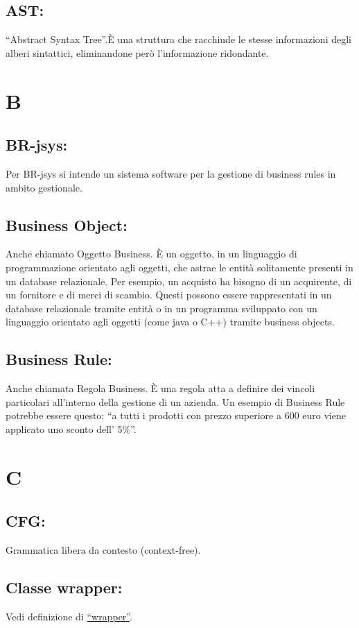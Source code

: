 \section{AST:} 
``Abstract Syntax Tree''.\`E una struttura che racchiude le stesse informazioni degli alberi sintattici, eliminandone per\`o l'informazione ridondante.

\chapter{B}
\section{BR-jsys:}
Per BR-jsys si intende un sistema software per la gestione di business rules in ambito gestionale.
\hypertarget{Business Object}{}
\section{Business Object:}
Anche chiamato Oggetto Business. \`E un oggetto, in un linguaggio di programmazione orientato agli oggetti, che astrae le entit\`a solitamente presenti in un database relazionale.
Per esempio, un acquisto ha bisogno di un acquirente, di un fornitore e di merci di scambio. Questi possono essere rappresentati in un database relazionale tramite entit\`a o in un programma sviluppato con un linguaggio orientato agli oggetti (come java o C++) tramite business objects.
\hypertarget{Business Rule}{}
\section{Business Rule:}
Anche chiamata Regola Business. \`E una regola atta a definire dei vincoli particolari all'interno della gestione di un azienda. Un esempio di Business Rule potrebbe essere questo: ``a tutti i prodotti con prezzo superiore a 600 euro  viene applicato uno sconto dell' 5\%''.

\chapter{C}
\section{CFG:}
Grammatica libera da contesto (context-free). 
\section{Classe wrapper:}
Vedi definizione di \hyperlink{wrapper}{``wrapper''}.

